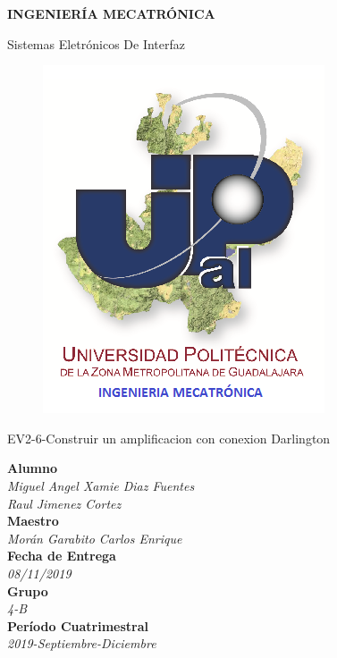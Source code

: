 \documentclass[10pt,a4paper]{article}
\author{Miguel Angel Xamie Diaz Fuentes/Jimenez Cortes Raul}
\begin{document}
\begin{center}
\begin{LARGE}
\textbf{INGENIERÍA MECATRÓNICA}\\
\end{LARGE}
{\large Sistemas Eletrónicos De Interfaz}\\

\begin{figure}[hbtp]
\centering
\includegraphics[scale=0.80]{UPZMG_Mecatr_nica.png}
\end{figure} 

\begin{center}
\begin{LARGE}
EV2-6-Construir un amplificacion con conexion Darlington
\end{LARGE}
\end{center}

\begin{Large}
\textbf{Alumno}
\\\textit{Miguel Angel Xamie Diaz Fuentes\\Raul Jimenez Cortez}
\textbf{\\Maestro}
\\\textit{Morán Garabito Carlos Enrique}
\textbf{\\Fecha de Entrega}
\\\textit{08/11/2019}
\textbf{\\Grupo}
\\\textit{4-B}\\
\textbf{Período Cuatrimestral}\\
\textit{2019-Septiembre-Diciembre}
\\
\end{Large}

\end{center}
\end{document}
